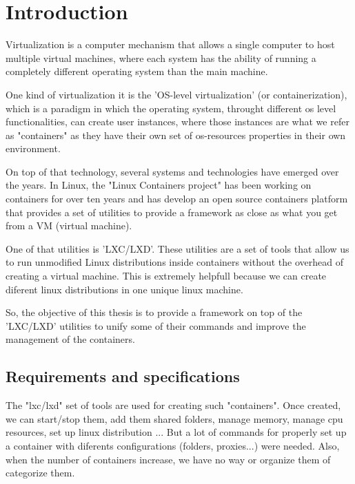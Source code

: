 \clearpage\section{Introduction}

Virtualization is a computer mechanism that allows a single computer to host multiple virtual machines, where each system has the ability of running a completely different operating system than the main machine. 

One kind of virtualization it is the 'OS-level virtualization' (or containerization), which is a paradigm in which the operating system, throught different os level functionalities, can create user instances, where those instances are what we refer as "containers" as they have their own set of os-resources properties in their own environment.

On top of that technology, several systems and technologies have emerged over the years. In Linux, the "Linux Containers project" has been working on containers for over ten years and has develop an open source containers platform that provides a set of utilities to provide a framework as close as what you get from a VM (virtual machine). 

One of that utilities is 'LXC/LXD'. These utilities are a set of tools that allow us to run unmodified Linux distributions inside containers without the overhead of creating a virtual machine. This is extremely helpfull because we can create diferent linux distributions in one unique linux machine.

So, the objective of this thesis is to provide a framework on top of the 'LXC/LXD' utilities to unify some of their commands and improve the management of the containers.

\bigskip

\subsection{Requirements and specifications}
\label{ssec:requirements}
The "lxc/lxd" set of tools are used for creating such "containers". Once created, we can start/stop them, add them shared folders, manage memory, manage cpu resources, set up linux distribution ...
But a lot of commands for properly set up a container with diferents configurations (folders, proxies...) were needed. Also, when the number of containers increase, we have no way or organize them of categorize them.

